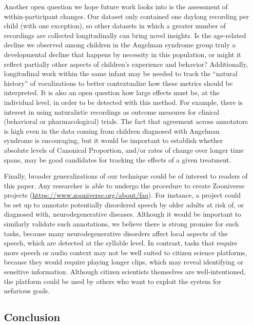 \documentclass[english,,man]{apa6}
\begin{document}
Another open question we hope future work looks into is the assessment of within-participant changes. Our dataset only contained one daylong recording per child (with one exception), so other datasets in which a greater number of recordings are collected longitudinally can bring novel insights. Is the age-related decline we observed among children in the Angelman syndrome group truly a developmental decline that happens by necessity in this population, or might it reflect partially other aspects of children's experience and behavior? Additionally, longitudinal work within the same infant may be needed to track the \enquote{natural history} of vocalizations to better contextualize how these metrics should be interpreted. It is also an open question how large effects must be, at the individual level, in order to be detected with this method. For example, there is interest in using naturalistic recordings as outcome measures for clinical (behavioral or pharmacological) trials. The fact that agreement across annotators is high even in the data coming from children diagnosed with Angelman syndrome is encouraging, but it would be important to establish whether absolute levels of Canonical Proportion, and/or rates of change over longer time spans, may be good candidates for tracking the effects of a given treatment.

Finally, broader generalizations of our technique could be of interest to readers of this paper. Any researcher is able to undergo the procedure to create Zooniverse projects (\url{https://www.zooniverse.org/about/faq}). For instance, a project could be set up to annotate potentially disordered speech by older adults at risk of, or diagnosed with, neurodegenerative diseases. Although it would be important to similarly validate such annotations, we believe there is strong promise for such tasks, because many neurodegenerative disorders affect local aspects of the speech, which are detected at the syllable level. In contrast, tasks that require more speech or audio context may not be well suited to citizen science platforms, because they would require playing longer clips, which may reveal identifying or sensitive information. Although citizen scientists themselves are well-intentioned, the platform could be used by others who want to exploit the system for nefarious goals.

\hypertarget{conclusion}{%
\subsection{Conclusion}\label{conclusion}}
\end{document}
